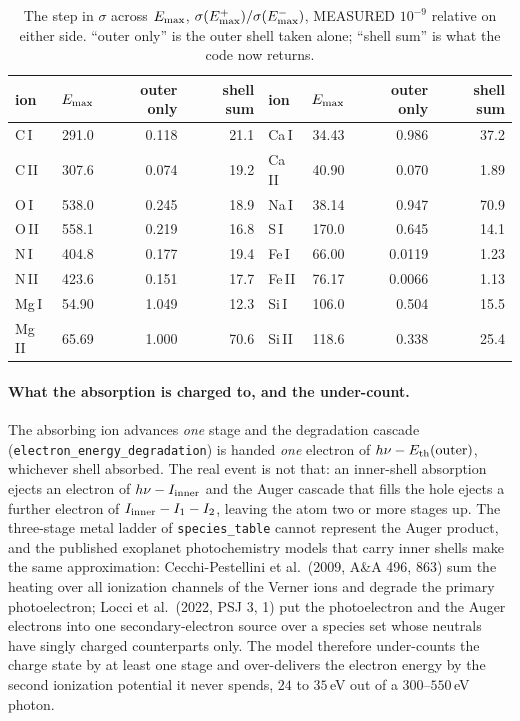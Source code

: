 \documentclass[english,a4paper]{my_memo}
\begin{document}
\begin{table}[h]
\centering
\caption{The step in $\sigma$ across $E_{\rm max}$, $\sigma(E_{\rm
max}^{+})/\sigma(E_{\rm max}^{-})$, MEASURED $10^{-9}$ relative on either
side. ``outer only'' is the outer shell taken alone; ``shell sum'' is what
the code now returns.}
\label{tab:emaxjump}
\begin{tabular}{lrrr@{\qquad}lrrr}
\toprule
ion & $E_{\rm max}$ & outer only & shell sum &
ion & $E_{\rm max}$ & outer only & shell sum\\
\midrule
C\,I  & 291.0 & 0.118 & 21.1 & Ca\,I  &  34.43 & 0.986 & 37.2\\
C\,II & 307.6 & 0.074 & 19.2 & Ca\,II &  40.90 & 0.070 &  1.89\\
O\,I  & 538.0 & 0.245 & 18.9 & Na\,I  &  38.14 & 0.947 & 70.9\\
O\,II & 558.1 & 0.219 & 16.8 & S\,I   & 170.0 & 0.645 & 14.1\\
N\,I  & 404.8 & 0.177 & 19.4 & Fe\,I  &  66.00 & 0.0119 &  1.23\\
N\,II & 423.6 & 0.151 & 17.7 & Fe\,II &  76.17 & 0.0066 &  1.13\\
Mg\,I &  54.90 & 1.049 & 12.3 & Si\,I  & 106.0 & 0.504 & 15.5\\
Mg\,II&  65.69 & 1.000 & 70.6 & Si\,II & 118.6 & 0.338 & 25.4\\
\bottomrule
\end{tabular}
\end{table}

\paragraph{What the absorption is charged to, and the under-count.} The
absorbing ion advances \emph{one} stage and the degradation cascade
(\texttt{electron\_energy\_degradation}) is handed \emph{one} electron of
$h\nu - E_{\rm th}({\rm outer})$, whichever shell absorbed. The real event
is not that: an inner-shell absorption ejects an electron of
$h\nu - I_{\rm inner}$ and the Auger cascade that fills the hole ejects a
further electron of $I_{\rm inner} - I_1 - I_2$, leaving the atom two or
more stages up. The three-stage metal ladder of \texttt{species\_table}
cannot represent the Auger product, and the published exoplanet
photochemistry models that carry inner shells make the same approximation:
Cecchi-Pestellini et al.\ (2009, A\&A 496, 863) sum the heating over all
ionization channels of the Verner ions and degrade the primary
photoelectron; Locci et al.\ (2022, PSJ 3, 1) put the photoelectron and the
Auger electrons into one secondary-electron source over a species set whose
neutrals have singly charged counterparts only. The model therefore
under-counts the charge state by at least one stage and over-delivers the
electron energy by the second ionization potential it never spends, $24$ to
$35\,$eV out of a $300$--$550\,$eV photon.
\end{document}
